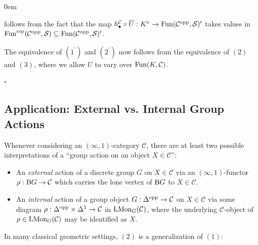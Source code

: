 \documentclass[10pt]{article}
\newcommand{\mS}{\mathcal S}
\newcommand{\C}{\mathcal C}
\renewcommand{\qed}{\hfill$\square$}
\renewenvironment{proof}{\begin{addmargin}[1em]{0em}\begin{newproof}}{\end{newproof}\end{addmargin}\qed}
\theoremstyle{witharg}
\theoremstyle{witharg}
\theoremstyle{witharg2}
\begin{document}
\begin{proof}
follows from the fact that the map $h^\C_\bullet\circ \overline{U}:K^\triangleright\rightarrow \textnormal{Fun}(\C^{\textnormal{opp}},\mS)^\prime$ takes values in $\textnormal{Fun}^{\textnormal{rep}}(\C^{\textnormal{opp}},\mS)\subseteq \textnormal{Fun}(\C^{\textnormal{opp}},\mS)^\prime$. 


    
    The equivalence of $(1^\prime)$ and $(2^\prime)$ now follows from the equivalence of $(2)$ and $(3)$, where we allow $U$ to vary over $\textnormal{Fun}(K,\C)$. 
    
\end{proof}










\subsection{Application: External vs. Internal Group Actions}\label{App. Ext vs Int}


Whenever considering an $(\infty,1)$-category $\C$, there are at least two possible interpretations of a ``group action on an object $X\in \C$'':

\begin{itemize}

    \item [$(1)$] An \emph{external} action of a discrete group $G$ on $X\in \C$ via an $(\infty,1)$-functor $\rho:\textnormal{B}G\rightarrow \C$ which carries the lone vertex of $\textnormal{B}G$ to $X\in \C$. 

    \item [$(2)$] An \emph{internal} action of a group object $G:\Delta^{\textnormal{opp}}\rightarrow \C$ on $X\in \C$ via some diagram $\rho:\Delta^{\textnormal{opp}}\times \Delta^1\rightarrow \C$ in $\textnormal{LMon}_G(\C)$, where the underlying $\C$-object of $\rho\in \textnormal{LMon}_G(\C)$ may be identified as $X$. 

\end{itemize}


\noindent In many classical geometric settings, $(2)$ is a generalization of $(1)$:
\end{document}
